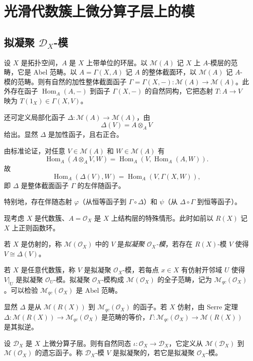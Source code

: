 \chapter{光滑代数簇上微分算子层上的模}

\section{拟凝聚 $\mathcal{D}_X$-模}

设 $X$ 是拓扑空间，$A$ 是 $X$ 上带单位的环层。以 $\mathcal{M}(A)$ 记 $X$ 上 $A$-模层的范畴，它是 Abel 范畴。以 $A=\Gamma(X,A)$ 记 $A$ 的整体截面环，以 $\mathcal{M}(A)$ 记 $A$-模的范畴。则有自然的加性整体截面函子 $\Gamma=\Gamma(X,-):\mathcal{M}(A)\to\mathcal{M}(A)$。此外存在函子 $\operatorname{Hom}_A(A,-)$ 到函子 $\Gamma(X,-)$ 的自然同构，它把态射 $T:A\to V$ 映为 $T(1_X)\in\Gamma(X,V)$。

还可定义局部化函子 $\Delta:\mathcal{M}(A)\to\mathcal{M}(A)$，由
$$\Delta(V)=A\otimes_A V$$
给出。显然 $\Delta$ 是加性函子，且右正合。

由标准论证，对任意 $V\in\mathcal{M}(A)$ 和 $W\in\mathcal{M}(A)$ 有
$$\operatorname{Hom}_A(A\otimes_A V,W)=\operatorname{Hom}_A(V,\operatorname{Hom}_A(A,W)).$$
故
$$\operatorname{Hom}_A(\Delta(V),W)=\operatorname{Hom}_A(V,\Gamma(X,W)),$$
即 $\Delta$ 是整体截面函子 $\Gamma$ 的左伴随函子。

特别地，存在伴随态射 $\varphi$（从恒等函子到 $\Gamma\circ\Delta$）和 $\psi$（从 $\Delta\circ\Gamma$ 到恒等函子）。

现考虑 $X$ 是代数簇、$A=\mathcal{O}_X$ 是 $X$ 上结构层的特殊情形。此时如前以 $R(X)$ 记 $X$ 上正则函数环。

若 $X$ 是仿射的，称 $\mathcal{M}(\mathcal{O}_X)$ 中的 $V$ 是\emph{拟凝聚 $\mathcal{O}_X$-模}，若存在 $R(X)$-模 $V$ 使得 $V\cong\Delta(V)$。

若 $X$ 是任意代数簇，称 $V$ 是拟凝聚 $\mathcal{O}_X$-模，若每点 $x\in X$ 有仿射开邻域 $U$ 使得 $V|_U$ 是拟凝聚 $\mathcal{O}_U$-模。拟凝聚 $\mathcal{O}_X$-模构成 $\mathcal{M}(\mathcal{O}_X)$ 的全子范畴，记为 $\mathcal{M}_{qc}(\mathcal{O}_X)$。可以检验 $\mathcal{M}_{qc}(\mathcal{O}_X)$ 是 Abel 范畴。

显然 $\Delta$ 是从 $\mathcal{M}(R(X))$ 到 $\mathcal{M}_{qc}(\mathcal{O}_X)$ 的函子。若 $X$ 仿射，由 Serre 定理 $\Delta:\mathcal{M}(R(X))\to\mathcal{M}_{qc}(\mathcal{O}_X)$ 是范畴的等价，$\Gamma:\mathcal{M}_{qc}(\mathcal{O}_X)\to\mathcal{M}(R(X))$ 是其拟逆。

设 $\mathcal{D}_X$ 是 $X$ 上微分算子层。则有自然同态 $\iota:\mathcal{O}_X\to\mathcal{D}_X$，它定义从 $\mathcal{M}(\mathcal{D}_X)$ 到 $\mathcal{M}(\mathcal{O}_X)$ 的遗忘函子。称 $\mathcal{D}_X$-模 $V$ 是拟凝聚的，若它是拟凝聚 $\mathcal{O}_X$-模。

